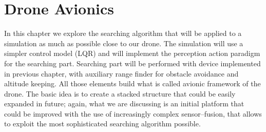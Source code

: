 \chapter{Drone Avionics}
\minitoc
\thispagestyle{plain}

\renewcommand{\arraystretch}{1.75}

In this chapter we explore the searching algorithm that will be applied to a simulation as much as possible close to our drone. The simulation will use a simpler control model (LQR) and will implement the perception action paradigm for the searching part. Searching part will be performed with device implemented in previous chapter, with auxiliary range finder for obstacle avoidance and altitude keeping. All those elements build what is called avionic framework of the drone. The basic idea is to create a stacked structure that could be easily expanded in future; again, what we are discussing is an initial platform that could be improved with the use of  increasingly complex sensor--fusion, that allows to exploit the most sophisticated searching algorithm possible. 







